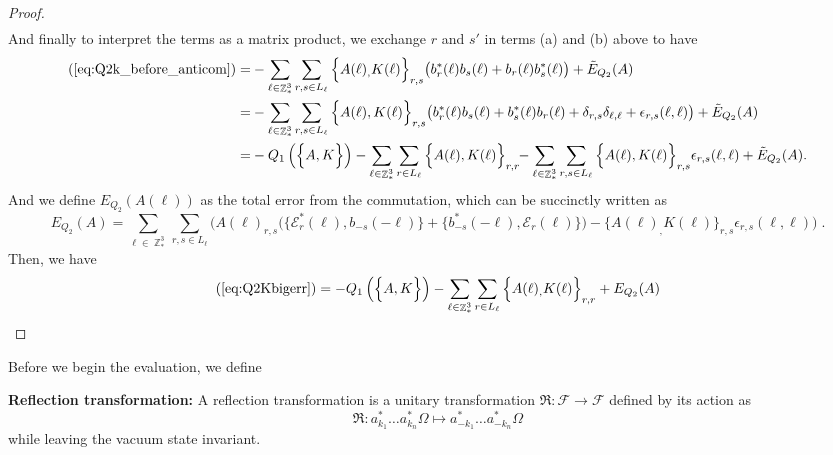 \documentclass[sn-mathphys, Numbered ,a4paper]{sn-jnl}%
\DeclareMathOperator{\Z}{\mathbb{Z}}
\theoremstyle{plain}
\theoremstyle{definition}
\theoremstyle{remark}
\theoremstyle{plain}
\theoremstyle{definition}
\theoremstyle{remark}
\begin{document}
\begin{proof}
\begin{align}
\end{align}
And finally to interpret the terms as a matrix product, we exchange $r$ and $s'$ in terms (a) and (b) above to have 
\begin{alignat}{2}
    (\ref{eq:Q2k_before_anticom}) = &-\sum\limits_{\ell \in \Z^3_*}\sum\limits_{r,s \in L_{\ell}}\Big\{A(\ell)_
        ,K(\ell)\Big\}_{r,s}\big(b^*_{r}(\ell)b_{s}(\ell)+b_{r}(\ell)b^*_{s}(\ell) \big)\nonumber +\tilde E_{Q_2}(A)\\
        = &-\sum\limits_{\ell \in \Z^3_*}\sum\limits_{r,s \in L_{\ell}}\Big\{A(\ell), K(\ell) \Big\}_{r,s} \big( b^*_{r}(\ell) b_{s}(\ell) + b^*_{s}(\ell) b_{r}(\ell) + \delta_{r,s} \delta_{\ell,\ell} + \epsilon_{r,s}(\ell,\ell) \big) + \tilde E_{Q_2}(A)\\
        =&- Q_1 \left(\Big\{A,K\Big\}\right) - \sum\limits_{\ell \in \Z^3_*} \sum\limits_{r \in L_{\ell}} \Big\{ A(\ell),K(\ell) \Big\}_{r,r}\!\! -\sum\limits_{\ell \in \Z^3_*} \sum\limits_{r,s \in L_{\ell}} \Big\{ A(\ell), K(\ell) \Big\}_{r,s} \epsilon_{r,s}(\ell,\ell)  + \tilde{E}_{Q_2}(A). \label{eq:Q2Kbigerr}
\end{alignat}
And we define $E_{Q_2}(A(\ell))$ as the total error from the commutation, which can be succinctly written as 
\begin{equation}
    E_{Q_2}(A) =
    \sum\limits_{\ell \in \Z^3_*} \sum\limits_{r,s \in L_{\ell}} \Big( A(\ell)_{r,s} \big( \big\{ \mathcal{E}^*_{r}(\ell), b_{-s}(-\ell) \big\} + \big\{ b^*_{-s}(-\ell) , \mathcal{E}_r(\ell) \big\} \big)-\big\{A(\ell)_,K(\ell) \big\}_{r,s} \epsilon_{r,s}(\ell,\ell) \Big)\;.  
\end{equation}
Then, we have 
\begin{equation}
    (\ref{eq:Q2Kbigerr}) = -Q_1\left(\Big\{A,K\Big\}\right)-\sum\limits_{\ell \in \Z^3_*} \sum\limits_{r \in L_{\ell}}\Big\{A(\ell)_
        ,K(\ell)\Big\}_{r,r} + E_{Q_2}(A) 
\end{equation}
\end{proof}
Before we begin the evaluation, we define\newline

\textbf{Reflection transformation:} A reflection transformation is a unitary transformation $\mathfrak{R}:\mathcal{F}\rightarrow \mathcal{F}$ defined by its action as
\begin{equation}
    \mathfrak{R}: a^*_{k_1}\ldots a^*_{k_n}\Omega \mapsto a^*_{-k_1}\ldots a^*_{-k_n}\Omega 
\end{equation}
while leaving the vacuum state invariant.\newline
\end{document}
